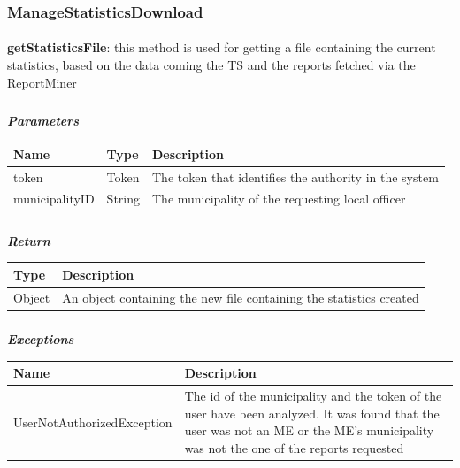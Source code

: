 				\subsubsection{ManageStatisticsDownload}
					\paragraph{}
							\textbf{getStatisticsFile}: this method is used for getting a file containing the current statistics, based on the data coming the TS and the reports fetched via the ReportMiner
							\subparagraph{}
							\vspace{-3mm}
							\textit{\textbf{Parameters}}
							\vspace{-2mm}
								\begin{table}[!h]
									\begin{tabular}{L{0.2\textwidth}L{0.15\textwidth}L{0.45\textwidth}}
										\toprule
										\textbf{Name} & \textbf{Type} & \textbf{Description} \\
										\midrule
								  		token & Token & The token that identifies the authority in the system \\
								  		municipalityID & String & The municipality of the requesting local officer \\
								 		\bottomrule
									\end{tabular}
								\end{table}
							\subparagraph{}
							\vspace{-6mm}
								\textit{\textbf{Return}}
								\vspace{-2mm}
									\begin{table}[!h]
									\begin{tabular}{L{0.2\textwidth}L{0.6\textwidth}}
										\toprule
										\textbf{Type} & \textbf{Description} \\
										\midrule
								  		Object & An object containing the new file containing the statistics created \\
								 		\bottomrule
									\end{tabular}
								\end{table}
							\clearpage
							\subparagraph{}
								\textit{\textbf{Exceptions}}
								\vspace{-2mm}
									\begin{table}[!h]
									\begin{tabular}{L{0.4\textwidth}L{0.4\textwidth}}
										\toprule
										\textbf{Name} & \textbf{Description} \\
										\midrule
								  		UserNotAuthorizedException & The id of the municipality and the token of the user have been analyzed. It was found that the user was not an ME or the ME's  municipality was not the one of the reports requested  \\
								 		\bottomrule
									\end{tabular}
								\end{table}
